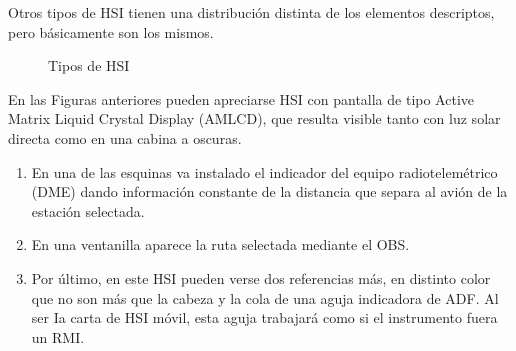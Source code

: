 Otros tipos de HSI tienen una distribución distinta de los elementos descriptos, pero básicamente son los mismos.


\begin{figure}[!h]
  \centering
  \caption{Tipos de HSI}
\end{figure}



En las Figuras anteriores pueden apreciarse HSI con pantalla de tipo Active Matrix Liquid Crystal Display (AMLCD), que resulta visible tanto con luz solar directa como en una cabina a oscuras.

\begin{enumerate}

\item En una de las esquinas va instalado el indicador del equipo radiotelemétrico (DME) dando información constante de la distancia que separa al avión de la estación selectada.


\item En una ventanilla aparece la ruta selectada mediante el OBS. 


\item Por último, en este HSI pueden verse dos referencias más, en distinto color que no son más que la cabeza y la cola de una aguja indicadora de ADF. Al ser Ia carta de HSI móvil, esta aguja trabajará como si el instrumento fuera un RMI.

\end{enumerate}



